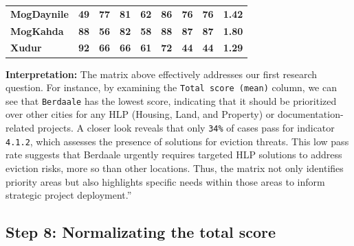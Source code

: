 \documentclass[
]{report}
\begin{document}
\begin{longtable}[t]{>{\centering\arraybackslash}p{.5in}>{}c>{}c>{}c>{}c>{}c>{}c>{}c>{\centering\arraybackslash}p{.4in}}
\addlinespace
\textbf{MogDaynile} & \textcolor[HTML]{443B84}{\textbf{\textbf{49}}} & \textcolor[HTML]{77D153}{\textbf{\textbf{77}}} & \textcolor[HTML]{60CA60}{\textbf{\textbf{81}}} & \textcolor[HTML]{69CD5B}{\textbf{\textbf{62}}} & \textcolor[HTML]{31B57B}{\textbf{\textbf{86}}} & \textcolor[HTML]{50C46A}{\textbf{\textbf{76}}} & \textcolor[HTML]{50C46A}{\textbf{\textbf{76}}} & \textcolor[HTML]{20A486}{\textbf{1.42}}\\
\textbf{MogKahda} & \textcolor[HTML]{CAE11F}{\textbf{\textbf{88}}} & \textcolor[HTML]{297A8E}{\textbf{\textbf{56}}} & \textcolor[HTML]{75D054}{\textbf{\textbf{82}}} & \textcolor[HTML]{32B67A}{\textbf{\textbf{58}}} & \textcolor[HTML]{50C46A}{\textbf{\textbf{88}}} & \textcolor[HTML]{EFE51C}{\textbf{\textbf{87}}} & \textcolor[HTML]{EFE51C}{\textbf{\textbf{87}}} & \textcolor[HTML]{FDE725}{\textbf{1.80}}\\
\textbf{Xudur} & \textcolor[HTML]{FDE725}{\textbf{\textbf{92}}} & \textcolor[HTML]{21A685}{\textbf{\textbf{66}}} & \textcolor[HTML]{3C508B}{\textbf{\textbf{66}}} & \textcolor[HTML]{58C765}{\textbf{\textbf{61}}} & \textcolor[HTML]{443B84}{\textbf{\textbf{72}}} & \textcolor[HTML]{440154}{\textbf{\textbf{44}}} & \textcolor[HTML]{440154}{\textbf{\textbf{44}}} & \textcolor[HTML]{26828E}{\textbf{1.29}}\\
\bottomrule
\end{longtable}
\endgroup{}

\textbf{Interpretation:} The matrix above effectively addresses our
first research question. For instance, by examining the
\texttt{Total\ score\ (mean)} column, we can see that \texttt{Berdaale}
has the lowest score, indicating that it should be prioritized over
other cities for any HLP (Housing, Land, and Property) or
documentation-related projects. A closer look reveals that only
\texttt{34\%} of cases pass for indicator \texttt{4.1.2}, which assesses
the presence of solutions for eviction threats. This low pass rate
suggests that Berdaale urgently requires targeted HLP solutions to
address eviction risks, more so than other locations. Thus, the matrix
not only identifies priority areas but also highlights specific needs
within those areas to inform strategic project deployment.''

\subsection{Step 8: Normalizating the total
score}\label{step-8-normalizating-the-total-score}
\end{document}
